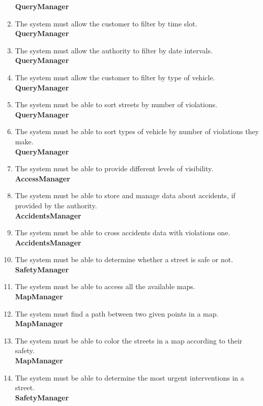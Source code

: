 \begin{enumerate}[label=\textbf{R\arabic*}]
		\textbf{QueryManager}
		\item \label{req:timeFilter} The system must allow the customer to filter by time slot.\\
		\textbf{QueryManager}
		\item \label{req:dateFilter} The system must allow the authority to filter by date intervals.\\
		\textbf{QueryManager}
		\item \label{req:vehicleFilter} The system must allow the customer to filter by type of vehicle.\\
		\textbf{QueryManager}
		\item \label{req:sortedResult} The system must be able to sort streets by number of violations.\\
		\textbf{QueryManager}
		\item \label{req:sortedVehicles} The system must be able to sort types of vehicle by number of violations they make.\\
		\textbf{QueryManager}
		\item \label{req:visibility} The system must be able to provide different levels of visibility.\\
		\textbf{AccessManager}
		\item \label{req:accidentsData} The system must be able to store and manage data about accidents, if provided by the authority.\\
		\textbf{AccidentsManager}
		\item \label{req:crossData} The system must be able to cross accidents data with violations one.\\
		\textbf{AccidentsManager}
		\item \label{req:safeStreet} The system must be able to determine whether a street is safe or not.\\
		\textbf{SafetyManager}
		\item \label{req:cityStreets} The system must be able to access all the available maps.\\
		\textbf{MapManager}
		\item \label{req:pathFinder} The system must find a path between two given points in a map.\\
		\textbf{MapManager}
		\item \label{req:colorMap} The system must be able to color the streets in a map according to their safety.\\
		\textbf{MapManager}
		\item \label{req:interventions} The system must be able to determine the most urgent interventions in a street.	\\
		\textbf{SafetyManager}
	\end{enumerate}